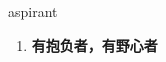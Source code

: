 
\begin{frame}
{\huge aspirant}
\begin{center}
\begin{enumerate}\Large
  \item \textbf{有抱负者，有野心者}
\end{enumerate}
\end{center}
\end{frame}

